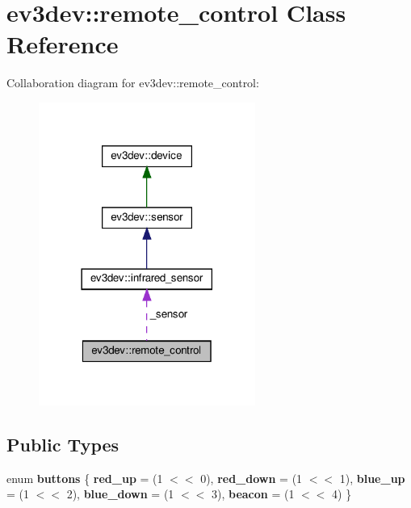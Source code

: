 \hypertarget{classev3dev_1_1remote__control}{}\section{ev3dev\+:\+:remote\+\_\+control Class Reference}
\label{classev3dev_1_1remote__control}


Collaboration diagram for ev3dev\+:\+:remote\+\_\+control\+:
\nopagebreak
\begin{figure}[H]
\begin{center}
\leavevmode
\includegraphics[width=201pt]{classev3dev_1_1remote__control__coll__graph}
\end{center}
\end{figure}
\subsection*{Public Types}
\begin{DoxyCompactItemize}
\item 
\mbox{\label{classev3dev_1_1remote__control_accb8306bbfc25ca0767bd275b19e4321}} 
enum {\bfseries buttons} \{ \newline
{\bfseries red\+\_\+up} = (1 $<$$<$ 0), 
{\bfseries red\+\_\+down} = (1 $<$$<$ 1), 
{\bfseries blue\+\_\+up} = (1 $<$$<$ 2), 
{\bfseries blue\+\_\+down} = (1 $<$$<$ 3), 
\newline
{\bfseries beacon} = (1 $<$$<$ 4)
 \}
\end{DoxyCompactItemize}
